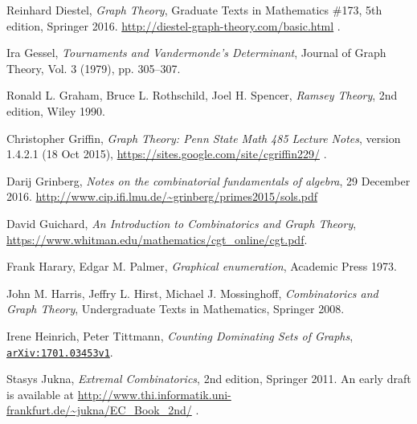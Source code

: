 \documentclass[numbers=enddot,12pt,final,onecolumn,notitlepage]{scrartcl}%
\theoremstyle{definition}
\newcommand\arxiv[1]{\href{http://www.arxiv.org/abs/#1}{\texttt{arXiv:#1}}}
\begin{document}
\begin{thebibliography}{9999999999}

Reinhard Diestel, \textit{Graph Theory},
Graduate Texts in Mathematics \#173, 5th edition, Springer 2016.
\newline \url{http://diestel-graph-theory.com/basic.html} .

Ira Gessel, \textit{Tournaments and
Vandermonde's Determinant}, Journal of Graph Theory, Vol. 3 (1979), pp. 305--307.

Ronald L. Graham, Bruce L. Rothschild,
Joel H. Spencer, \textit{Ramsey Theory}, 2nd edition,
Wiley 1990.

Christopher Griffin,
\textit{Graph Theory: Penn State Math 485 Lecture Notes},
version 1.4.2.1 (18 Oct 2015),
\newline\url{https://sites.google.com/site/cgriffin229/} .

Darij Grinberg, \textit{Notes on the combinatorial
fundamentals of algebra}, 29 December 2016.
\newline\url{http://www.cip.ifi.lmu.de/~grinberg/primes2015/sols.pdf}

David Guichard,
\textit{An Introduction to Combinatorics and Graph Theory},
\newline\url{https://www.whitman.edu/mathematics/cgt_online/cgt.pdf}.

Frank Harary, Edgar M. Palmer,
\textit{Graphical enumeration},
Academic Press 1973.

John M. Harris, Jeffry L. Hirst, Michael J. Mossinghoff,
\textit{Combinatorics and Graph Theory}, Undergraduate Texts in
Mathematics, Springer 2008.


Irene Heinrich, Peter Tittmann,
\textit{Counting Dominating Sets of Graphs},
\arxiv{1701.03453v1}.

Stasys Jukna,
\textit{Extremal Combinatorics}, 2nd edition, Springer 2011.
An early draft is available at
\url{http://www.thi.informatik.uni-frankfurt.de/~jukna/EC_Book_2nd/} .


\end{thebibliography}
\end{document}
